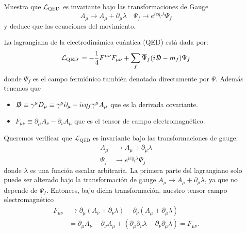 
\begin{ejercicio} 
	Muestra que $\mathcal{L}_{\text{QED}}$ es invariante bajo las transformaciones de Gauge  
	\begin{equation*}
		A_\mu \rightarrow A_\mu + \partial_\mu \lambda \quad \Psi_f \rightarrow e^{ieq_f\lambda}\Psi_f
	\end{equation*}
	y deduce que las ecuaciones del movimiento.
\end{ejercicio}


\begin{solucion} 
	La lagrangiana de la electrodinámica cuántica (QED) está dada por:
	\begin{equation*}
		\mathcal{L}_{\text{QED'}} = - \frac{1}{4} F^{\mu\nu}F_{\mu\nu}+ \sum_f\overline{\Psi}_f (i\slashed{D} - m_f) \Psi_f 
	\end{equation*}
	donde $\Psi_f$ es el campo fermiónico también denotado directamente por $\Psi$. Además tenemos que 
	\begin{itemize}
		\item $\slashed{D} \equiv \gamma^\mu D_\mu \equiv \gamma^\mu \partial_\mu - ieq_f  \gamma^\mu A_\mu$ que es la derivada covariante.
		\item $F_{\mu\nu} \equiv \partial_\mu A_\nu - \partial_\nu A_\mu$ que es el tensor de campo electromagnético.
	\end{itemize}
	Queremos verificar que $\mathcal{L}_{\text{QED}}$ es invariante bajo las transformaciones de gauge:
	\begin{align*}
		A_\mu &\to A_\mu + \partial_\mu \lambda \\
		\Psi_f &\to e^{ieq_f\lambda} \Psi_f
	\end{align*}
	donde $\lambda$ es una función escalar arbitraria. La primera parte del lagrangiano solo puede ser alterado bajo la transformación de gauge $A_\mu \to A_\mu + \partial_\mu \lambda$, ya que no depende de $\Psi_f$. Entonces, bajo dicha transformación, nuestro tensor campo electromagnético 
	\begin{align*}
		F_{\mu\nu} &\to \partial_\mu (A_\nu + \partial_\nu \lambda) - \partial_\nu (A_\mu + \partial_\mu \lambda) \\
		&= \partial_\mu A_\nu - \partial_\nu A_\mu + (\partial_\mu \partial_\nu \lambda - \partial_\nu \partial_\mu \lambda)= F_{\mu\nu}.

\end{align*}
\end{solucion}

